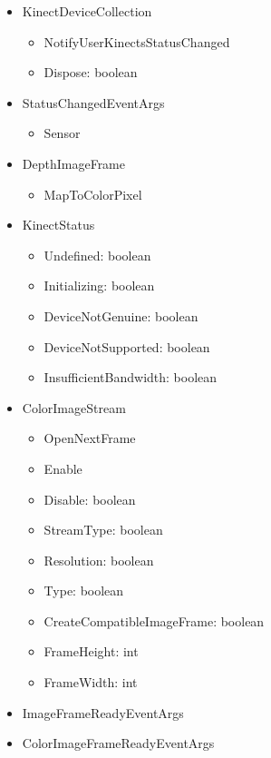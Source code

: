 \documentclass[11pt,a4paper]{article}
\begin{document}
\begin{itemize}
\begin{itemize}
	\end{itemize}
\item KinectDeviceCollection	
	\begin{itemize}
	\item NotifyUserKinectsStatusChanged	
	\item Dispose: boolean	
	\end{itemize}
\item StatusChangedEventArgs
	\begin{itemize}
	\item Sensor
	\end{itemize}
\item DepthImageFrame
	\begin{itemize}
	\item MapToColorPixel
	\end{itemize}
\item KinectStatus
	\begin{itemize}
	\item Undefined: boolean
	\item Initializing: boolean
	\item DeviceNotGenuine: boolean
	\item DeviceNotSupported: boolean
	\item InsufficientBandwidth: boolean
	\end{itemize}
\item ColorImageStream
	\begin{itemize}
	\item OpenNextFrame
	\item Enable
	\item Disable: boolean
	\item StreamType: boolean
	\item Resolution: boolean
	\item Type: boolean
	\item CreateCompatibleImageFrame: boolean	
	\item FrameHeight: int
	\item FrameWidth: int
	\end{itemize}
\item ImageFrameReadyEventArgs
\item ColorImageFrameReadyEventArgs
	\begin{itemize}

\end{itemize}
\end{itemize}
\end{document}
